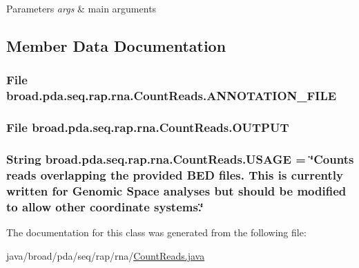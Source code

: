 \begin{DoxyParams}{Parameters}
{\em args} & main arguments \\
\hline
\end{DoxyParams}


\subsection{Member Data Documentation}
\hypertarget{classbroad_1_1pda_1_1seq_1_1rap_1_1rna_1_1_count_reads_a0b968bbfdf18dab50437a63348f365ac}{
\subsubsection[{A\+N\+N\+O\+T\+A\+T\+I\+O\+N\+\_\+\+F\+I\+L\+E}]{\setlength{\rightskip}{0pt plus 5cm}File broad.\+pda.\+seq.\+rap.\+rna.\+Count\+Reads.\+A\+N\+N\+O\+T\+A\+T\+I\+O\+N\+\_\+\+F\+I\+L\+E}}\label{classbroad_1_1pda_1_1seq_1_1rap_1_1rna_1_1_count_reads_a0b968bbfdf18dab50437a63348f365ac}
\hypertarget{classbroad_1_1pda_1_1seq_1_1rap_1_1rna_1_1_count_reads_a063614ef19c16b390c8e3f75a5d38304}{
\subsubsection[{O\+U\+T\+P\+U\+T}]{\setlength{\rightskip}{0pt plus 5cm}File broad.\+pda.\+seq.\+rap.\+rna.\+Count\+Reads.\+O\+U\+T\+P\+U\+T}}\label{classbroad_1_1pda_1_1seq_1_1rap_1_1rna_1_1_count_reads_a063614ef19c16b390c8e3f75a5d38304}
\hypertarget{classbroad_1_1pda_1_1seq_1_1rap_1_1rna_1_1_count_reads_a889ad6de8a0db40425ff77dbf24aabfd}{
\subsubsection[{U\+S\+A\+G\+E}]{\setlength{\rightskip}{0pt plus 5cm}String broad.\+pda.\+seq.\+rap.\+rna.\+Count\+Reads.\+U\+S\+A\+G\+E = \char`\"{}Counts reads overlapping the provided B\+E\+D files. This is currently written for Genomic Space analyses but should be modified to allow other coordinate systems.\char`\"{}}}\label{classbroad_1_1pda_1_1seq_1_1rap_1_1rna_1_1_count_reads_a889ad6de8a0db40425ff77dbf24aabfd}


The documentation for this class was generated from the following file\+:\begin{DoxyCompactItemize}
\item 
java/broad/pda/seq/rap/rna/\hyperlink{rna_2_count_reads_8java}{Count\+Reads.\+java}\end{DoxyCompactItemize}
